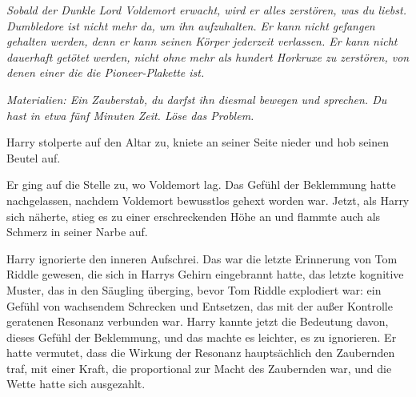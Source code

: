 

\emph{Sobald der Dunkle Lord Voldemort erwacht, wird er alles zerstören, was du liebst. Dumbledore ist nicht mehr da, um ihn aufzuhalten. Er kann nicht gefangen gehalten werden, denn er kann seinen Körper jederzeit verlassen. Er kann nicht dauerhaft getötet werden, nicht ohne mehr als hundert Horkruxe zu zerstören, von denen einer die die Pioneer-Plakette ist.}

\emph{Materialien: Ein Zauberstab, du darfst ihn diesmal bewegen und sprechen. Du hast in etwa fünf Minuten Zeit. Löse das Problem.}

Harry stolperte auf den Altar zu, kniete an seiner Seite nieder und hob seinen Beutel auf.

Er ging auf die Stelle zu, wo Voldemort lag. Das Gefühl der Beklemmung hatte nachgelassen, nachdem Voldemort bewusstlos gehext worden war. Jetzt, als Harry sich näherte, stieg es zu einer erschreckenden Höhe an und flammte auch als Schmerz in seiner Narbe auf.

Harry ignorierte den inneren Aufschrei. Das war die letzte Erinnerung von Tom Riddle gewesen, die sich in Harrys Gehirn eingebrannt hatte, das letzte kognitive Muster, das in den Säugling überging, bevor Tom Riddle explodiert war: ein Gefühl von wachsendem Schrecken und Entsetzen, das mit der außer Kontrolle geratenen Resonanz verbunden war. Harry kannte jetzt die Bedeutung davon, dieses Gefühl der Beklemmung, und das machte es leichter, es zu ignorieren. Er hatte vermutet, dass die Wirkung der Resonanz hauptsächlich den Zaubernden traf, mit einer Kraft, die proportional zur Macht des Zaubernden war, und die Wette hatte sich ausgezahlt.

